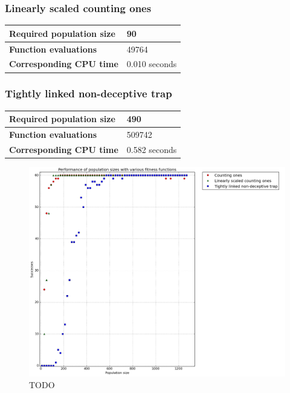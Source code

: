 \documentclass[12pt]{article}
\theoremstyle{definition}
\newcommand{\mytable}[3]{
\begin{table}[H]
\begin{tabular}{|ll|}
\hline
\textbf{Required population size} & #1            \\ \hline
\textbf{Function evaluations}     & #2            \\ \hline
\textbf{Corresponding CPU time}   & #3 seconds    \\ \hline
\end{tabular}
\end{table}
}
\begin{document}
\subsubsection*{Linearly scaled counting ones}
\mytable{90}{49764}{0.010}

\subsubsection*{Tightly linked non-deceptive trap}
\mytable{490}{509742}{0.582}


\begin{figure}[H]
    \centering
    \includegraphics[width=1\linewidth]{images/exp3.png}
    \caption{TODO}
\label{fig:exp3}
\end{figure}
\end{document}

